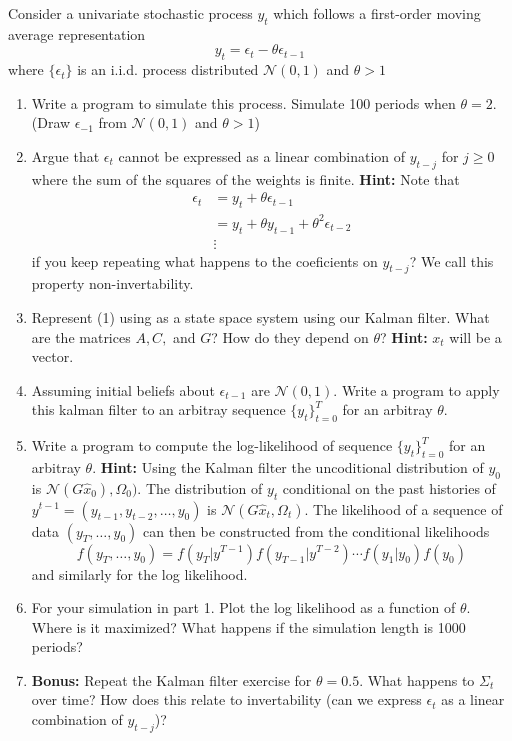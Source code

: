 \documentclass{exam}
\begin{document}
Consider a univariate stochastic process $y_t$ which follows a first-order moving average representation
\begin{equation}
	y_t = \epsilon_t - \theta\epsilon_{t-1}
\end{equation}where $\{\epsilon_t\}$ is an i.i.d. process distributed $\mathcal N(0,1)$ and $\theta > 1$

\begin{enumerate}
 	\item Write a program to simulate this process.  Simulate 100 periods when $\theta =2$. (Draw $\epsilon_{-1}$ from $\mathcal N(0,1)$ and $\theta > 1$)
 	\item Argue that $\epsilon_t$ cannot be expressed as a linear combination of $y_{t-j}$ for $j\geq0$ where the sum of the squares of the weights is finite. \textbf{Hint:} Note that 
 	\begin{align*}
 		\epsilon_t &= y_t + \theta\epsilon_{t-1}\\
 				   &= y_t + \theta y_{t-1} +\theta^2 \epsilon_{t-2}\\
 				   &\vdots
 	\end{align*} 
 	if you keep repeating what happens to the coeficients on $y_{t-j}$?  We call this property non-invertability.
 	\item Represent (1) using as a state space system using our Kalman filter.  What are the matrices $A,C,$ and $G$?  How do they depend on $\theta$? \textbf{Hint:} $x_t$ will be a vector.
 	\item Assuming initial beliefs about $\epsilon_{t-1}$ are $\mathcal N(0,1)$.  Write a program to apply this kalman filter to an arbitray sequence $\{y_t\}_{t=0}^T$ for an arbitray $\theta$.
 	\item Write a program to compute the log-likelihood of sequence $\{y_t\}_{t=0}^T$ for an arbitray $\theta$. \textbf{Hint: }  Using the Kalman filter the uncoditional distribution of $y_0$ is $\mathcal N(G\hat x_0),\Omega_0)$.  The distribution of $y_t$ conditional on the past histories of $y^{t-1}=(y_{t-1},y_{t-2},\ldots,y_0)$ is $\mathcal N(G\hat x_t,\Omega_t)$.  The likelihood of a sequence of data $(y_T,\ldots,y_0)$ can then be constructed from the conditional likelihoods
 	\begin{equation}
 		f(y_T,\ldots,y_0) = f(y_T|y^{T-1})f(y_{T-1}|y^{T-2})\cdots f(y_1|y_0)f(y_0)
 	\end{equation}
 	and similarly for the log likelihood.
 	\item For your simulation in part 1. Plot the log likelihood as a function of $\theta$.  Where is it maximized?  What happens if the simulation length is 1000 periods?

 	\item  \textbf{Bonus:} Repeat the Kalman filter exercise for $\theta = 0.5$.  What happens to $\Sigma_t$ over time?  How does this relate to invertability (can we express $\epsilon_t$ as a linear combination of $y_{t-j}$)?
 \end{enumerate} 
\end{document}
